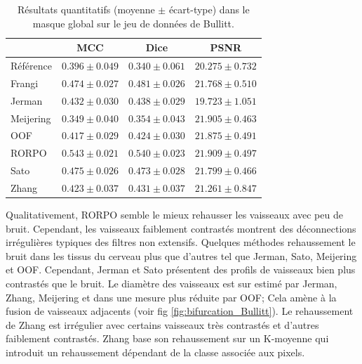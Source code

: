 \begin{table}[H]
  \begin{center}
      \caption{Résultats quantitatifs (moyenne $\pm$ écart-type) dans le masque global \maskglobal sur le jeu de données de Bullitt.}
      \label{Table:quantitative results Bullit}
  \begin{tabular}{lccc}
      \hline
          & MCC & Dice & PSNR \\ 
      \hline
      Référence	& $ 0.396 \pm 0.049 $ & $ 0.340 \pm 0.061 $ & $ 20.275 \pm	0.732 $ \\ 
      Frangi	    & $ 0.474 \pm 0.027 $ & $ 0.481 \pm 0.026 $ & $ 21.768 \pm	0.510 $ \\ 
      Jerman	    & $ 0.432 \pm 0.030 $ & $ 0.438 \pm 0.029 $ & $ 19.723 \pm	1.051 $ \\ 
      Meijering	& $ 0.349 \pm 0.040 $ & $ 0.354 \pm 0.043 $ & $ 21.905 \pm	0.463 $ \\ 
      OOF	        & $ 0.417 \pm 0.029 $ & $ 0.424 \pm 0.030 $ & $ 21.875 \pm	0.491 $ \\ 
      RORPO	    & $ 0.543 \pm 0.021 $ & $ 0.540 \pm 0.023 $ & $ 21.909 \pm	0.497 $ \\ 
      Sato	    & $ 0.475 \pm 0.026 $ & $ 0.473 \pm 0.028 $ & $ 21.799 \pm	0.466 $ \\ 
      Zhang	    & $ 0.423 \pm 0.037 $ & $ 0.431 \pm 0.037 $ & $ 21.261 \pm	0.847 $ \\ 

      \hline
  \end{tabular} 
\end{center}
\end{table}

Qualitativement, RORPO semble le mieux rehausser les vaisseaux avec peu de bruit. Cependant, les vaisseaux faiblement contrastés montrent des déconnections irrégulières typiques des filtres non extensifs. Quelques méthodes rehaussement le bruit dans les tissus du cerveau plus que d'autres tel que Jerman, Sato, Meijering et OOF. Cependant, Jerman et Sato présentent des profils de vaisseaux bien plus contrastés que le bruit. Le diamètre des vaisseaux est sur estimé par Jerman, Zhang, Meijering et dans une mesure plus réduite par OOF; Cela amène à la fusion de vaisseaux adjacents (voir fig \ref{fig:bifurcation_Bullitt}). Le rehaussement de Zhang est irrégulier avec certains vaisseaux très contrastés et d'autres faiblement contrastés. Zhang base son rehaussement sur un K-moyenne qui introduit un rehaussement dépendant de la classe associée aux pixels.

